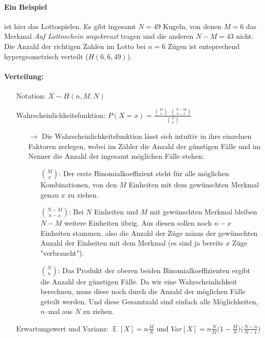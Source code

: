 \documentclass[a4paper]{article}
\DeclareMathOperator*{\E}{\mathbb{E}}
\begin{document}
\paragraph{Ein Beispiel} ist hier das Lottospielen. Es gibt ingesamt $N=49$ Kugeln, von denen $M=6$ das Merkmal \textit{Auf Lottoschein angekreuzt} tragen und die anderen $N-M=43$ nicht. Die Anzahl der richtigen Zahlen im Lotto bei $n=6$ Zügen ist entsprechend hypergeometrisch verteilt ($H(6,6,49)$).

\paragraph{Verteilung:}
\begin{itemize}
\item[] Notation: $X\sim H(n,M,N)$
\item[] Wahrscheinlichkeitsfunktion: $P(X=x)=\frac{\binom{M}{x}\cdot\binom{N-M}{n-x}}{\binom{N}{n}}$
	\begin{itemize}
	\item[$\rightarrow$] Die Wahrscheinlichkeitsfunktion lässt sich intuitiv in ihre einzelnen Faktoren zerlegen, wobei im Zähler die Anzahl der günstigen Fälle und im Nenner die Anzahl der ingesamt möglichen Fälle stehen:
		\begin{itemize}
		\item[] $\binom{M}{x}$: Der erste Binomialkoeffizient steht für alle möglichen Kombinationen, von den $M$ Einheiten mit dem gewünschten Merkmal genau $x$ zu ziehen.
		\item[] $\binom{N-M}{n-x}$: Bei $N$ Einheiten und $M$ mit gewünschten Merkmal bleiben $N-M$ weitere Einheiten übrig. Aus diesen sollen noch $n-x$ Einheiten stammen, also die Anzahl der Züge minus der gewünschten Anzahl der Einheiten mit dem Merkmal (es sind ja bereits $x$ Züge "verbraucht").
		\item[] $\binom{N}{n}$: Das Produkt der oberen beiden Binomialkoeffizienten ergibt die Anzahl der günstigen Fälle. Da wir eine Wahrscheinlichkeit berechnen, muss diese noch durch die Anzahl der möglichen Fälle geteilt werden. Und diese Gesamtzahl sind einfach alle Möglichkeiten, $n$--mal aus $N$ zu ziehen. 
		\end{itemize}
	\end{itemize}
\item[] Erwartungswert und Varianz: $\E[X]=n\frac{M}{N}$ und $Var[X]=n\frac{N}{M}\Big(1-\frac{M}{N} \Big)\Big(\frac{N-n}{N-1} \Big)$
\end{itemize}
\end{document}
